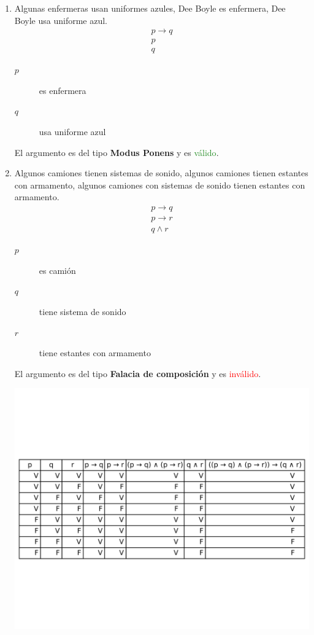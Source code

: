\documentclass[12pt,letterpaper]{exam}
\begin{document}
\begin{enumerate}
\begin{enumerate}[label=\alph*)]
\item Algunas enfermeras usan uniformes azules, Dee Boyle es enfermera, Dee Boyle usa uniforme azul.
\[
\begin{array}{c}
p \to q \\
p \\
\hline
q
\end{array}
\]
\begin{description}
  \item[$p$] es enfermera
  \item[$q$] usa uniforme azul
\end{description}

El argumento es del tipo \textbf{Modus Ponens} y es \textcolor{ForestGreen}{válido}.

\item Algunos camiones tienen sistemas de sonido, algunos camiones tienen estantes con armamento, algunos camiones con sistemas de sonido tienen estantes con armamento.
\[
\begin{array}{c}
p \to q \\
p \to r \\
\hline
q \land r
\end{array}
\]
\begin{description}
  \item[$p$] es camión
  \item[$q$] tiene sistema de sonido
  \item[$r$] tiene estantes con armamento
\end{description}

El argumento es del tipo \textbf{Falacia de composición} y es \textcolor{red}{inválido}.

\begin{center}
    \includegraphics[height=0.4\textheight]{../assets/Talleres_fundamentos/Taller2_ejercicio_k.png}
  \end{center}

\end{enumerate}


\end{enumerate}
\end{document}
